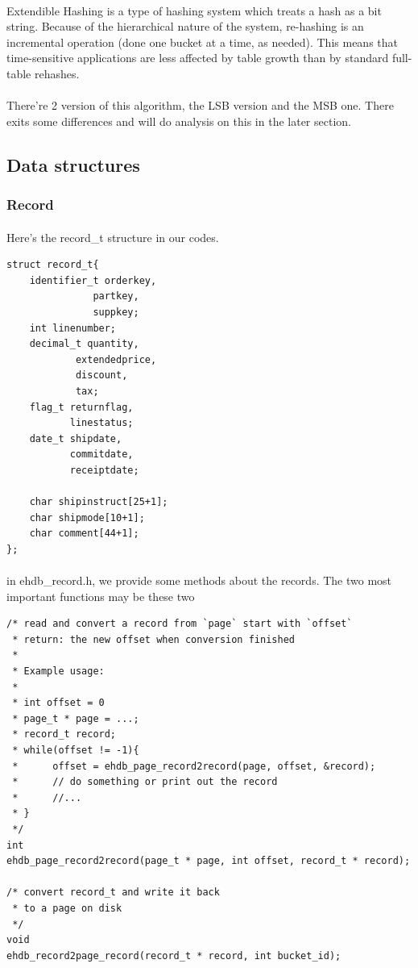 \documentclass{article}
\begin{document}
\begin{enumerate}
                \paragraph{}
                    Extendible Hashing is a type of hashing system which treats a hash as a bit string. Because of the hierarchical nature of the system, re-hashing is an incremental operation (done one bucket at a time, as needed). This means that time-sensitive applications are less affected by table growth than by standard full-table rehashes.
                \paragraph{}
                    There're 2 version of this algorithm, the LSB version and the MSB one. There exits some differences and will do analysis on this in the later section.
        \end{enumerate}
    \subsection{Data structures}
        \subsubsection{Record}
            \paragraph{}
                Here's the record\_t structure in our codes.
\begin{verbatim}
struct record_t{
    identifier_t orderkey, 
               partkey, 
               suppkey;
    int linenumber;
    decimal_t quantity,
            extendedprice,
            discount,
            tax;
    flag_t returnflag,
           linestatus;
    date_t shipdate,
           commitdate,
           receiptdate;

    char shipinstruct[25+1];
    char shipmode[10+1];
    char comment[44+1];
};
\end{verbatim}
            \paragraph{}
                in ehdb\_record.h, we provide some methods about the records. The two most important functions may be these two
\begin{verbatim}
/* read and convert a record from `page` start with `offset`
 * return: the new offset when conversion finished
 *
 * Example usage:
 *
 * int offset = 0
 * page_t * page = ...;
 * record_t record;
 * while(offset != -1){
 *      offset = ehdb_page_record2record(page, offset, &record);
 *      // do something or print out the record
 *      //...
 * }
 */
int 
ehdb_page_record2record(page_t * page, int offset, record_t * record);

/* convert record_t and write it back
 * to a page on disk
 */
void 
ehdb_record2page_record(record_t * record, int bucket_id);
\end{verbatim}
\end{document}

